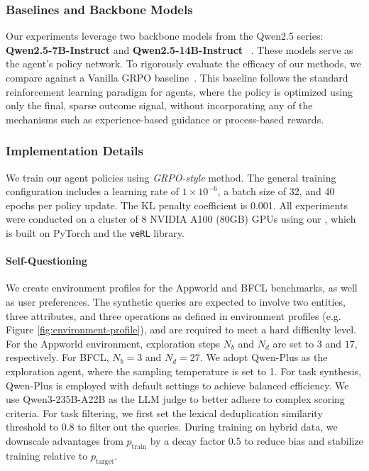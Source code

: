 \subsubsection{Baselines and Backbone Models}
Our experiments leverage two backbone models from the Qwen2.5 series: \textbf{Qwen2.5-7B-Instruct} and \textbf{Qwen2.5-14B-Instruct}~\citep{team2024qwen2} . These models serve as the agent's policy network.
To rigorously evaluate the efficacy of our methods, we compare against a Vanilla GRPO baseline~\citep{deepseek_math}. This baseline follows the standard reinforcement learning paradigm for agents, where the policy is optimized using only the final, sparse outcome signal, without incorporating any of the \AgentEvolver mechanisms such as experience-based guidance or process-based rewards.




\subsubsection{Implementation Details}
We train our agent policies using  \emph{GRPO-style} method.
The general training configuration includes a learning rate of $1 \times 10^{-6}$, a batch size of 32, and 40 epochs per policy update. The KL penalty coefficient is 0.001.
All experiments were conducted on a cluster of 8 NVIDIA A100 (80GB) GPUs using our \AgentEvolver, which is built on PyTorch and the \texttt{veRL} library.

\paragraph{Self-Questioning}
We create environment profiles for the Appworld and BFCL benchmarks, as well as user preferences. The synthetic queries are expected to involve two entities, three attributes, and three operations as defined in environment profiles (e.g. Figure \ref{fig:environment-profile}), and are required to meet a hard difficulty level. For the Appworld environment, exploration steps $N_b$ and $N_d$ are set to $3$ and $17$, respectively. For BFCL, $N_b=3$ and $N_d=27$. We adopt Qwen-Plus as the exploration agent, where the sampling temperature is set to 1. For task synthesis, Qwen-Plus is employed with default settings to achieve balanced efficiency. We use Qwen3-235B-A22B as the LLM judge to better adhere to complex scoring criteria. For task filtering, we first set the lexical deduplication similarity threshold to 0.8 to filter out the queries. During training on hybrid data, we downscale advantages from $p_{\mathrm{train}}$ by a decay factor $0.5$ to reduce bias and stabilize training relative to $p_{\mathrm{target}}$.



